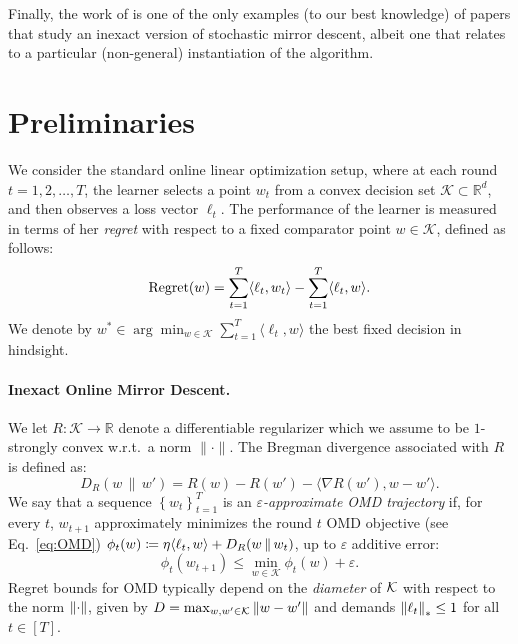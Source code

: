 \documentclass[10pt]{article}
\theoremstyle{definition}
\theoremstyle{remark}
\renewcommand{\epsilon}{\varepsilon}
\newcommand{\curly}[1]{ {\left\{ #1 \right\}}}
\newcommand{\reg}{{\rm Regret}}
\begin{document}
Finally, the work of \citet{guigues2021inexact} is one of the only examples (to our best knowledge) of papers that study an inexact version of stochastic mirror descent, albeit one that relates to a particular (non-general) instantiation of the algorithm.


\section{Preliminaries}
We consider the standard online linear optimization setup, where at each round \(t = 1, 2, \ldots, T\), the learner selects a point \(w_t\) from a convex decision set \(\mathcal{K} \subset \mathbb{R}^d\), and then observes a loss vector \(\ell_t\). The performance of the learner is measured in terms of her \emph{regret} with respect to a fixed comparator point \(w \in \mathcal{K}\), defined as follows:
\[
\reg(w) = \sum_{t=1}^T \langle \ell_t, w_t \rangle - \sum_{t=1}^T \langle \ell_t, w \rangle.
\]
We denote by \(w^* \in \arg\min_{w \in \mathcal{K}} \sum_{t=1}^T \langle \ell_t, w \rangle\) the best fixed decision in hindsight.

\paragraph{Inexact Online Mirror Descent.}
We let \(R : \mathcal{K} \to \mathbb{R}\) denote a differentiable regularizer which we assume to be $1$-strongly convex w.r.t.~a norm \(\|\cdot\|\).
The Bregman divergence associated with \(R\) is  defined as:
\[
D_R(w \,\|\, w') = R(w) - R(w') - \langle \nabla R(w'), w - w' \rangle.
\]
We say that a sequence $\curly{w_t}_{t=1}^T$ is an \emph{$\epsilon$-approximate OMD trajectory} if, for every $t$, $w_{t+1}$ approximately minimizes the round $t$ OMD objective (see Eq.~\ref{eq:OMD}) 
 $\phi_t (w) \coloneqq \eta \langle \ell_t, w \rangle + D_R(w \,\|\, w_t)$, up to $\epsilon$ additive error:
\[
\phi_t(w_{t+1}) \le \min_{w \in \mathcal{K}} \phi_t(w) + \epsilon.
\]
% 
Regret bounds for OMD typically depend on the \emph{diameter} of $\mathcal K$ with respect to the norm $\norm{\cdot}$, given by $D=\max_{w,w'\in\cK} \norm{w-w'}$ and demands $\norm{\ell_t}_* \le 1$ for all $t\in[T]$. 
\end{document}
